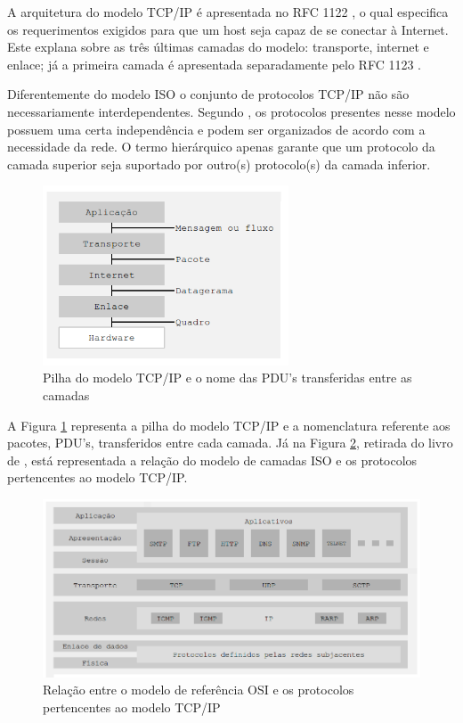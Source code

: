 A arquitetura do modelo TCP/IP é apresentada no RFC 1122 \cite{RFC1122}, o qual especifica os requerimentos exigidos para que um host seja capaz de se conectar à Internet. Este explana sobre as três últimas camadas do modelo: transporte, internet e enlace; já a primeira camada é apresentada separadamente pelo RFC 1123 \cite{RFC1123}.

Diferentemente do modelo ISO o conjunto de protocolos TCP/IP não são necessariamente interdependentes. Segundo , os protocolos presentes nesse modelo possuem uma certa independência e podem ser organizados de acordo com a necessidade da rede. O termo hierárquico apenas garante que um protocolo da camada superior seja suportado por outro(s) protocolo(s) da camada inferior.

\begin{figure}[H]
	\centering
    \includegraphics[width=0.65\textwidth]{04-figuras/TCPIP.png}
    \caption{Pilha do modelo TCP/IP e o nome das PDU's transferidas entre as camadas}
    \label{fig:TCPIP}
\end{figure} 

A Figura \ref{fig:TCPIP} representa a pilha do modelo TCP/IP e a nomenclatura referente aos pacotes, PDU's, transferidos entre cada camada. Já na Figura \ref{fig:relacao}, retirada do livro de , está representada a relação do modelo de camadas ISO e os protocolos pertencentes ao modelo TCP/IP. 

\begin{figure}[H]
	\centering
    \includegraphics[width=\textwidth]{04-figuras/relacao.png}
    \caption{Relação entre o modelo de referência OSI e os protocolos pertencentes ao modelo TCP/IP }
    \label{fig:relacao}
\end{figure}    


